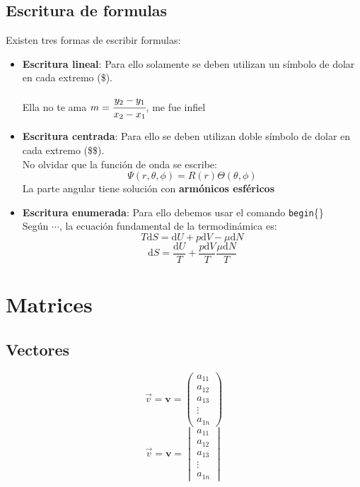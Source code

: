 \documentclass[12pt,a4paper]{book} %
\begin{document}
         \subsection*{Escritura de formulas}
           Existen tres formas de escribir formulas:\begin{itemize}
           \item \textbf{Escritura lineal}: Para ello solamente se
           deben utilizan un símbolo de dolar en cada extremo (\$).     
           
           \begin{center}
              Ella no te ama $m=\cfrac{y_2-y_1}{x_2-x_1}$, me fue
              infiel
          \end{center}

          \item \textbf{Escritura centrada}: Para ello se deben
          utilizan doble símbolo de dolar en cada extremo (\$\$).
          \\[0.2cm] No olvidar que la función de onda se escribe: $$
          \Psi(r,\theta,\phi)=R(r)\Theta (\theta,\phi)$$ La parte
          angular tiene solución con \textbf{armónicos esféricos}

          \item \textbf{Escritura enumerada}: Para ello debemos usar
          el comando \texttt{begin}\{\}\\[0.2cm]
          Según $\cdots$, la ecuación fundamental de la termodinámica
          es:\begin{equation}
          T\text{d}S=\text{d}U+p\text{d}V-\mu\text{d}N
          \end{equation}
          $$\text{d}S=\frac{\text{d}U}{T}+\frac{p\text{d}V}{T}
          \frac{\mu\text{d}N}{T}$$
          \end{itemize}
          
         \section{Matrices}
         
             \subsection*{Vectores}
               $$\vec{v}=\textbf{v}=
               \begin{pmatrix}
                 a_{11} \\ a_{12} \\ a_{13} \\ \vdots \\ a_{1n}
               \end{pmatrix}$$
               $$\vec{v}=\textbf{v}=
               \begin{vmatrix}
                 a_{11} \\ a_{12} \\ a_{13} \\ \vdots \\ a_{1n}
              \end{vmatrix}$$
\end{document}
